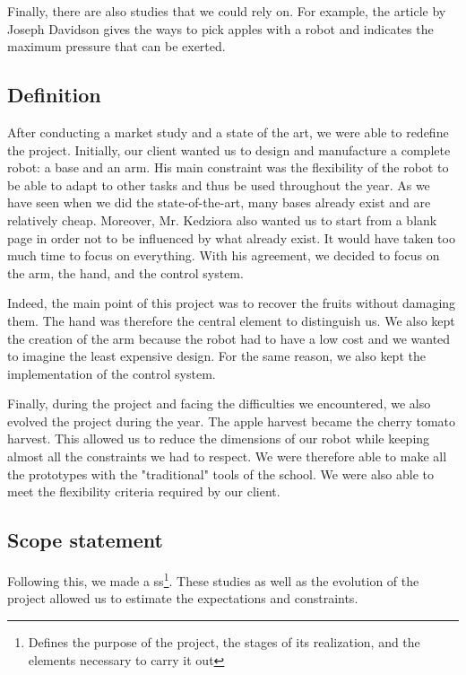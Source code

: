 \bigbreak
Finally, there are also studies that we could rely on. For example, the article by Joseph Davidson \cite{Davidson-2016-126540} gives the ways to pick apples with a robot and indicates the maximum pressure that can be exerted.

\subsection{Definition}

After conducting a market study and a state of the art, we were able to redefine the project. Initially, our client wanted us to design and manufacture a complete robot: a base and an arm. His main constraint was the flexibility of the robot to be able to adapt to other tasks and thus be used throughout the year. As we have seen when we did the state-of-the-art, many bases already exist and are relatively cheap. Moreover, Mr. Kedziora also wanted us to start from a blank page in order not to be influenced by what already exist. It would have taken too much time to focus on everything. With his agreement, we decided to focus on the arm, the hand, and the control system. 

\bigbreak
Indeed, the main point of this project was to recover the fruits without damaging them. The hand was therefore the central element to distinguish us. We also kept the creation of the arm because the robot had to have a low cost and we wanted to imagine the least expensive design. For the same reason, we also kept the implementation of the control system. 

\bigbreak
Finally, during the project and facing the difficulties we encountered, we also evolved the project during the year. The apple harvest became the cherry tomato harvest. This allowed us to reduce the dimensions of our robot while keeping almost all the constraints we had to respect. We were therefore able to make all the prototypes with the "traditional" tools of the school. We were also able to meet the flexibility criteria required by our client. 

\subsection{Scope statement}

Following this, we made a \gls{ss}\footnote{Defines the purpose of the project, the stages of its realization, and the elements necessary to carry it out}. These studies as well as the evolution of the project allowed us to estimate the expectations and constraints. 


